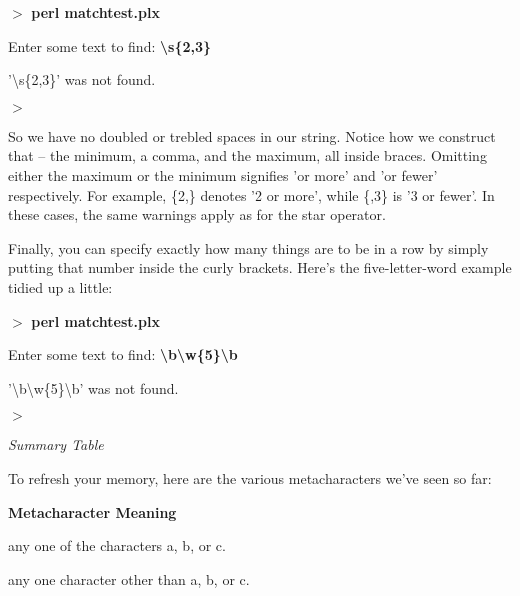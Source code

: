 \documentclass[a4paper,11pt]{book}
\begin{document}
\noindent 

\noindent $>$ \textbf{perl matchtest.plx}

\noindent Enter some text to find: \textbf{\textbackslash s\{2,3\}}

\noindent '\textbackslash s\{2,3\}' was not found.

\noindent $>$

\noindent 

\noindent So we have no doubled or trebled spaces in our string. Notice how we construct that -- the minimum, a comma, and the maximum, all inside braces. Omitting either the maximum or the minimum signifies 'or more' and 'or fewer' respectively. For example, \{2,\} denotes '2 or more', while \{,3\} is '3 or fewer'. In these cases, the same warnings apply as for the star operator.

\noindent 

\noindent Finally, you can specify exactly how many things are to be in a row by simply putting that number inside the curly brackets. Here's the five-letter-word example tidied up a little:

\noindent 

\noindent $>$ \textbf{perl matchtest.plx}

\noindent Enter some text to find: \textbf{\textbackslash b\textbackslash w\{5\}\textbackslash b}

\noindent '\textbackslash b\textbackslash w\{5\}\textbackslash b' was not found.

\noindent $>$

\noindent 

\noindent \textit{Summary Table}

\noindent To refresh your memory, here are the various metacharacters we've seen so far:

\noindent 

\noindent 

\noindent \textbf{Metacharacter Meaning}

\noindent 

\noindent [abc] any one of the characters a, b, or c.

\noindent 

\noindent [\^{}abc] any one character other than a, b, or c.

\noindent 

\noindent 

\noindent 

\noindent 

\noindent 
\end{document}
